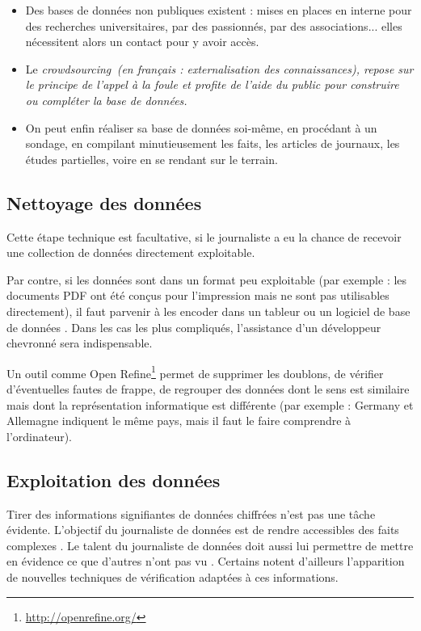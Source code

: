\begin{itemize}
\item Des bases de données non publiques existent : mises en places en interne pour des recherches universitaires, par des passionnés, par des associations... elles nécessitent alors un contact pour y avoir accès.
\item Le \em crowdsourcing\em\, (en français : externalisation des connaissances), repose sur le principe de \og l'appel à la foule \fg et profite de l'aide du public pour
construire ou compléter la base de données.
\item On peut enfin réaliser sa base de données soi-même, en procédant à un sondage, en compilant minutieusement
les faits, les articles de journaux, les études partielles, voire en se rendant sur le terrain.
\end{itemize}

\subsection{Nettoyage des données}

Cette étape technique est facultative, si le journaliste a eu la chance 
de recevoir une collection de données directement exploitable.

Par contre, si les données sont dans un format peu exploitable (par exemple : les
documents PDF ont été conçus pour l'impression mais ne sont pas utilisables
directement), il faut parvenir à les encoder dans un tableur ou un logiciel 
de base de données \cite{handbookfr, bradshaw}. Dans les cas les plus compliqués, l'assistance d'un 
développeur chevronné sera indispensable.

Un outil comme Open Refine\footnote{\url{http://openrefine.org/}} permet de
supprimer les doublons, de vérifier d'éventuelles fautes de frappe, de regrouper
des données dont le sens est similaire mais dont la représentation informatique
est différente (par exemple : \og Germany \fg et \og Allemagne \fg indiquent le même 
pays, mais il faut le faire comprendre à l'ordinateur).

\subsection{Exploitation des données}

Tirer des informations signifiantes de données chiffrées n'est pas une tâche 
évidente. L'objectif du journaliste de données est de rendre accessibles des faits complexes \cite {bradshaw}. Le talent du journaliste de données doit aussi lui permettre de mettre en évidence ce que d'autres n'ont pas vu \cite{digitaljournalism}.
Certains notent d'ailleurs l'apparition de nouvelles techniques de vérification adaptées à ces informations\cite{grevisse}.

